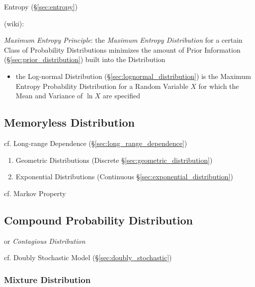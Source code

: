 Entropy (\S\ref{sec:entropy})

(wiki):

\emph{Maximum Entropy Principle}: the \emph{Maximum Entropy Distribution} for a
certain Class of Probability Distributions minimizes the amount of Prior
Information (\S\ref{sec:prior_distribution}) built into the Distribution

\begin{itemize}
  \item the Log-normal Distribution (\S\ref{sec:lognormal_distribution}) is the
    Maximum Entropy Probability Distribution for a Random Variable $X$ for which
    the Mean and Variance of $\ln X$ are specified
\end{itemize}



\subsection{Memoryless Distribution}\label{sec:memoryless_distribution}

cf. Long-range Dependence (\S\ref{sec:long_range_dependence})

\begin{enumerate}
  \item Geometric Distributions (Discrete \S\ref{sec:geometric_distribution})
  \item Exponential Distributions (Continuous
    \S\ref{sec:exponential_distribution})
\end{enumerate}

cf. Markov Property



\subsection{Compound Probability Distribution}
\label{sec:compound_probability}

or \emph{Contagious Distribution}

cf. Doubly Stochastic Model (\S\ref{sec:doubly_stochastic})



\subsubsection{Mixture Distribution}\label{sec:mixture_distribution}

